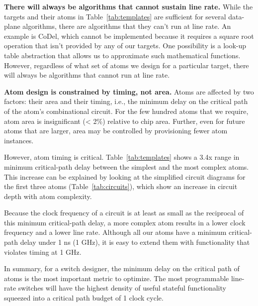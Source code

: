 \medskip
\noindent
\textbf{There will always be algorithms that cannot sustain line rate.}
While the targets and their atoms in Table~\ref{tab:templates} are sufficient
for several data-plane algorithms, there are algorithms that they can't run at
line rate.  An example is CoDel, which cannot be implemented because it
requires a square root operation that isn't provided by any of our targets. One
possibility is a look-up table abstraction that allows us to approximate such
mathematical functions. However, regardless of what set of atoms we design for
a particular target, there will always be algorithms that cannot run at line
rate.


\medskip
\noindent
\textbf{Atom design is constrained by timing, not area.}
Atoms are affected by two factors: their area and their timing, i.e., the
minimum delay on the critical path of the atom's combinational circuit. For
the few hundred atoms that we require, atom area is insignificant (< 2\%)
relative to chip area. Further, even for future atoms that are larger, area may
be controlled by provisioning fewer atom instances.

However, atom timing is critical. Table~\ref{tab:templates} shows a 3.4x
range in minimum critical-path delay between the simplest and the most complex atoms. This increase
can be explained by looking at the simplified circuit
diagrams for the first three atoms (Table~\ref{tab:circuits}), which show an
increase in circuit depth with atom complexity.

Because the clock frequency of
a circuit is at least as small as the reciprocal of this minimum critical-path delay, a more complex
atom results in a lower clock frequency and a lower line rate. Although all our
atoms have a minimum critical-path delay under 1 ns (1 GHz), it is easy to extend them
with functionality that violates timing at 1 GHz.

In summary, for a switch designer, the minimum delay on the critical path of atoms
is the most important metric to optimize. The most programmable line-rate
switches will have the highest density of useful stateful functionality
squeezed into a critical path budget of 1 clock cycle.

